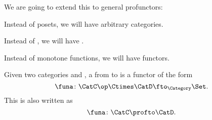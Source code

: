 We are going to extend this to general profunctors:
\begin{compactitem}
  \item Instead of posets, we will have arbitrary categories.
  \item Instead of \Bool, we will have \Set.
  \item Instead of monotone functions, we will have functors.
\end{compactitem}

\begin{ctdefinition}[Profunctors]
  \label{def:profunctor}
  Given two categories \CatC and \CatD, a \emph{} from \CatC to \CatD is a functor of the form
  \begin{equation}
    \label{eq:profunctors-def-1}
    \funa\colon \CatC\op \Ctimes \CatD \fto_{\Category} \Set.
  \end{equation}
  This is also written as
  \begin{equation}
    \label{eq:profunctors-def-2}
    \funa\colon \CatC \profto \CatD.
  \end{equation}
\end{ctdefinition}



